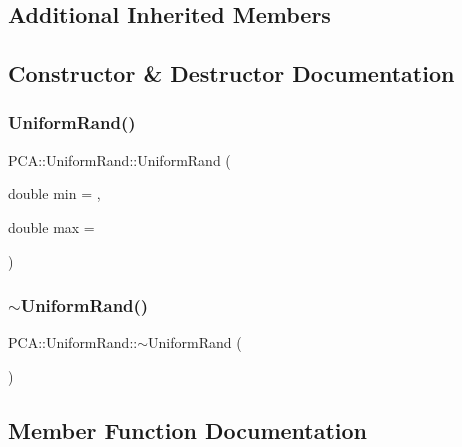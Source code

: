 \subsection*{Additional Inherited Members}


\subsection{Constructor \& Destructor Documentation}
\hypertarget{class_p_c_a_1_1_uniform_rand_abb80473523980666dd4d5a3f2d5805c1}{}\label{class_p_c_a_1_1_uniform_rand_abb80473523980666dd4d5a3f2d5805c1} 
\subsubsection{\texorpdfstring{Uniform\+Rand()}{UniformRand()}}
{\footnotesize\ttfamily P\+C\+A\+::\+Uniform\+Rand\+::\+Uniform\+Rand (\begin{DoxyParamCaption}\item[{double}]{min = {},  }\item[{double}]{max = {} }\end{DoxyParamCaption})}

\hypertarget{class_p_c_a_1_1_uniform_rand_ab42f6305d613b61c4b91be3956144a29}{}\label{class_p_c_a_1_1_uniform_rand_ab42f6305d613b61c4b91be3956144a29} 
\subsubsection{\texorpdfstring{$\sim$\+Uniform\+Rand()}{~UniformRand()}}
{\footnotesize\ttfamily P\+C\+A\+::\+Uniform\+Rand\+::$\sim$\+Uniform\+Rand (\begin{DoxyParamCaption}{ }\end{DoxyParamCaption})}



\subsection{Member Function Documentation}
\hypertarget{class_p_c_a_1_1_uniform_rand_a25b9b060f2201800a5badfa2b70d0eed}{}\label{class_p_c_a_1_1_uniform_rand_a25b9b060f2201800a5badfa2b70d0eed} 
